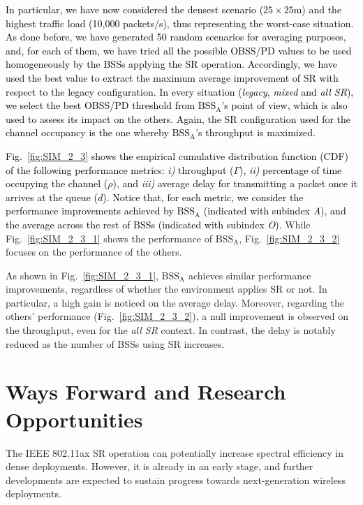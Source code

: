 \documentclass{ieeeaccess}
\begin{document}
\textcolor{black}{In particular, we have now considered the densest scenario ($25\times25$m) and the highest traffic load (10,000 packets/s), thus representing the worst-case situation. As done before, we have generated 50 random scenarios for averaging purposes, and, for each of them, we have tried all the possible OBSS/PD values to be used homogeneously by the BSSs applying the SR operation. Accordingly, we have used the best value to extract the maximum average improvement of SR with respect to the legacy configuration. In every situation (\emph{legacy}, \emph{mixed} and \emph{all SR}), we select the best OBSS/PD threshold from $\text{BSS}_\text{A}$'s point of view, which is also used to assess its impact on the others. Again, the SR configuration used for the channel occupancy is the one whereby $\text{BSS}_\text{A}$'s throughput is maximized.}

\textcolor{black}{Fig.~\ref{fig:SIM_2_3} shows the empirical cumulative distribution function (CDF) of the following performance metrics: \emph{i)} throughput ($\Gamma$), \emph{ii)} percentage of time occupying the channel ($\rho$), and \emph{iii)} average delay for transmitting a packet once it arrives at the queue ($d$). Notice that, for each metric, we consider the performance improvements achieved by $\text{BSS}_\text{A}$ (indicated with subindex \emph{A}), and the average across the rest of BSSs (indicated with subindex \emph{O}).} While Fig.~\ref{fig:SIM_2_3_1} shows the performance of BSS$_\text{A}$, Fig.~\ref{fig:SIM_2_3_2} focuses on the performance of the others.

As shown in Fig.~\ref{fig:SIM_2_3_1}, $\text{BSS}_\text{A}$ achieves similar performance improvements, regardless of whether the environment applies SR or not. In particular, a high gain is noticed on the average delay. Moreover, regarding the others' performance (Fig.~\ref{fig:SIM_2_3_2}), a null improvement is observed on the throughput, even for the \emph{all SR} context. In contrast, the delay is notably reduced as the number of BSSs using SR increases.

\section{Ways Forward and Research Opportunities}
\label{section:ways_forwad}
The IEEE 802.11ax SR operation can potentially increase spectral efficiency in dense deployments. However, it is already in an early stage, and further developments are expected to sustain progress towards next-generation wireless deployments. 
\end{document}
